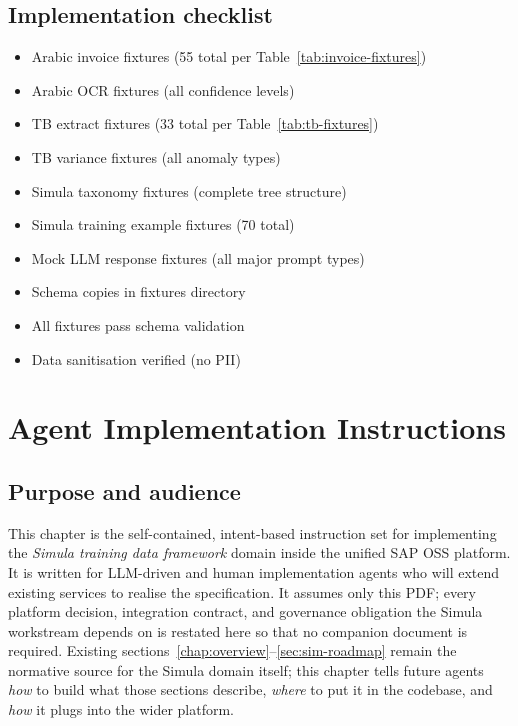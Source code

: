 \documentclass[12pt,a4paper,twoside]{report}
\begin{document}
\section{Implementation checklist}

\begin{itemize}
\item[\texttt{[ ]}] Arabic invoice fixtures (55 total per Table~\ref{tab:invoice-fixtures})
\item[\texttt{[ ]}] Arabic OCR fixtures (all confidence levels)
\item[\texttt{[ ]}] TB extract fixtures (33 total per Table~\ref{tab:tb-fixtures})
\item[\texttt{[ ]}] TB variance fixtures (all anomaly types)
\item[\texttt{[ ]}] Simula taxonomy fixtures (complete tree structure)
\item[\texttt{[ ]}] Simula training example fixtures (70 total)
\item[\texttt{[ ]}] Mock LLM response fixtures (all major prompt types)
\item[\texttt{[ ]}] Schema copies in fixtures directory
\item[\texttt{[ ]}] All fixtures pass schema validation
\item[\texttt{[ ]}] Data sanitisation verified (no PII)
\end{itemize}
\chapter{Agent Implementation Instructions}
\label{ch:agent-impl}

\section{Purpose and audience}
This chapter is the self-contained, intent-based instruction set for
implementing the \emph{Simula training data framework} domain inside
the unified SAP OSS platform. It is written for LLM-driven and human
implementation agents who will extend existing services to realise
the specification. It assumes only this PDF; every platform
decision, integration contract, and governance obligation the Simula
workstream depends on is restated here so that no companion document
is required. Existing sections~\ref{chap:overview}--\ref{sec:sim-roadmap}
remain the normative source for the Simula domain itself; this
chapter tells future agents \emph{how} to build what those sections
describe, \emph{where} to put it in the codebase, and \emph{how} it
plugs into the wider platform.
\end{document}
